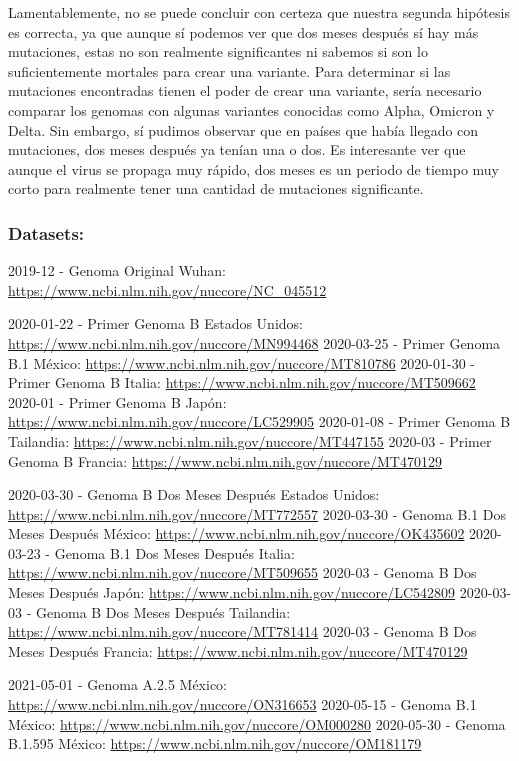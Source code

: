\documentclass[
  12pt,
]{article}
\begin{document}
Lamentablemente, no se puede concluir con certeza que nuestra segunda
hipótesis es correcta, ya que aunque sí podemos ver que dos meses
después sí hay más mutaciones, estas no son realmente significantes ni
sabemos si son lo suficientemente mortales para crear una variante. Para
determinar si las mutaciones encontradas tienen el poder de crear una
variante, sería necesario comparar los genomas con algunas variantes
conocidas como Alpha, Omicron y Delta. Sin embargo, sí pudimos observar
que en países que había llegado con mutaciones, dos meses después ya
tenían una o dos. Es interesante ver que aunque el virus se propaga muy
rápido, dos meses es un periodo de tiempo muy corto para realmente tener
una cantidad de mutaciones significante.

\hypertarget{datasets}{%
\subsubsection{Datasets:}\label{datasets}}

2019-12 - Genoma Original Wuhan:
\url{https://www.ncbi.nlm.nih.gov/nuccore/NC_045512}

2020-01-22 - Primer Genoma B Estados Unidos:
\url{https://www.ncbi.nlm.nih.gov/nuccore/MN994468} 2020-03-25 - Primer
Genoma B.1 México: \url{https://www.ncbi.nlm.nih.gov/nuccore/MT810786}
2020-01-30 - Primer Genoma B Italia:
\url{https://www.ncbi.nlm.nih.gov/nuccore/MT509662} 2020-01 - Primer
Genoma B Japón: \url{https://www.ncbi.nlm.nih.gov/nuccore/LC529905}
2020-01-08 - Primer Genoma B Tailandia:
\url{https://www.ncbi.nlm.nih.gov/nuccore/MT447155} 2020-03 - Primer
Genoma B Francia: \url{https://www.ncbi.nlm.nih.gov/nuccore/MT470129}

2020-03-30 - Genoma B Dos Meses Después Estados Unidos:
\url{https://www.ncbi.nlm.nih.gov/nuccore/MT772557} 2020-03-30 - Genoma
B.1 Dos Meses Después México:
\url{https://www.ncbi.nlm.nih.gov/nuccore/OK435602} 2020-03-23 - Genoma
B.1 Dos Meses Después Italia:
\url{https://www.ncbi.nlm.nih.gov/nuccore/MT509655} 2020-03 - Genoma B
Dos Meses Después Japón:
\url{https://www.ncbi.nlm.nih.gov/nuccore/LC542809} 2020-03-03 - Genoma
B Dos Meses Después Tailandia:
\url{https://www.ncbi.nlm.nih.gov/nuccore/MT781414} 2020-03 - Genoma B
Dos Meses Después Francia:
\url{https://www.ncbi.nlm.nih.gov/nuccore/MT470129}

2021-05-01 - Genoma A.2.5 México:
\url{https://www.ncbi.nlm.nih.gov/nuccore/ON316653} 2020-05-15 - Genoma
B.1 México: \url{https://www.ncbi.nlm.nih.gov/nuccore/OM000280}
2020-05-30 - Genoma B.1.595 México:
\url{https://www.ncbi.nlm.nih.gov/nuccore/OM181179}
\end{document}
